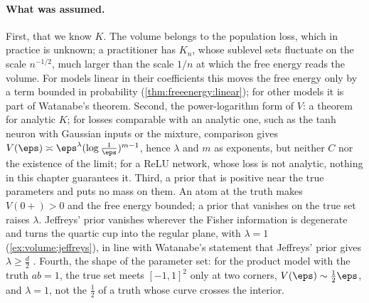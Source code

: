 \begin{refsection}
\paragraph{What was assumed.} First, that we know $K$. The volume belongs to the population loss, which in practice is unknown; a practitioner has $K_n$, whose sublevel sets fluctuate on the scale $n^{-1/2}$, much larger than the scale $1/n$ at which the free energy reads the volume. For models linear in their coefficients this moves the free energy only by a term bounded in probability (\cref{thm:freeenergy:linear}); for other models it is part of Watanabe's theorem. Second, the power-logarithm form of $V$: a theorem for analytic $K$; for losses comparable with an analytic one, such as the tanh neuron with Gaussian inputs or the mixture, comparison gives $V(\eps)\asymp\eps^\lambda(\log\frac1\eps)^{m-1}$, hence $\lambda$ and $m$ as exponents, but neither $C$ nor the existence of the limit; for a ReLU network, whose loss is not analytic, nothing in this chapter guarantees it. Third, a prior that is positive near the true parameters and puts no mass on them. An atom at the truth makes $V(0+)>0$ and the free energy bounded; a prior that vanishes on the true set raises $\lambda$. Jeffreys' prior vanishes wherever the Fisher information is degenerate and turns the quartic cup into the regular plane, with $\lambda=1$ (\cref{ex:volume:jeffreys}), in line with Watanabe's statement that Jeffreys' prior gives $\lambda\ge\frac d2$ \parencite{Watanabe2024}. Fourth, the shape of the parameter set: for the product model with the truth $ab=1$, the true set meets $[-1,1]^2$ only at two corners, $V(\eps)\sim\frac12\eps$, and $\lambda=1$, not the $\frac12$ of a truth whose curve crosses the interior.


\end{refsection}
